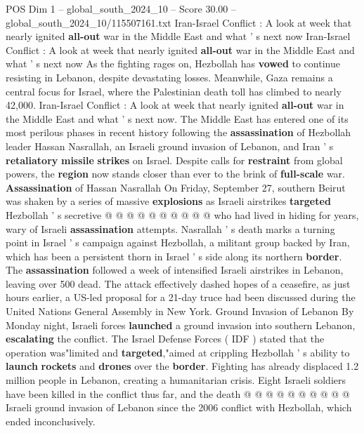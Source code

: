 \begin{textsample}{POS Dim 1 – global\_south\_2024\_10 – Score 30.00 – global\_south\_2024\_10/115507161.txt}  \label{ex:f1_pos_029}
Iran-Israel Conflict : A look at week that nearly ignited \textbf{all-out} war in the Middle East and what ' s next now Iran-Israel Conflict : A look at week that nearly ignited \textbf{all-out} war in the Middle East and what ' s next now As the fighting rages on, Hezbollah has \textbf{vowed} to continue resisting in Lebanon, despite devastating losses.
Meanwhile, Gaza remains a central focus for Israel, where the Palestinian death toll has climbed to nearly 42,000.
Iran-Israel Conflict : A look at week that nearly ignited \textbf{all-out} war in the Middle East and what ' s next now.
The Middle East has entered one of its most perilous phases in recent history following the \textbf{assassination} of Hezbollah leader Hassan Nasrallah, an Israeli ground invasion of Lebanon, and Iran ' s \textbf{retaliatory} \textbf{missile} \textbf{strikes} on Israel.
Despite calls for \textbf{restraint} from global powers, the \textbf{region} now stands closer than ever to the brink of \textbf{full-scale} war. \textbf{Assassination} of Hassan Nasrallah On Friday, September 27, southern Beirut was shaken by a series of massive \textbf{explosions} as Israeli airstrikes \textbf{targeted} Hezbollah ' s secretive @ @ @ @ @ @ @ @ @ @ who had lived in hiding for years, wary of Israeli \textbf{assassination} attempts.
Nasrallah ' s death marks a turning point in Israel ' s campaign against Hezbollah, a militant group backed by Iran, which has been a persistent thorn in Israel ' s side along its northern \textbf{border}.
The \textbf{assassination} followed a week of intensified Israeli airstrikes in Lebanon, leaving over 500 dead.
The attack effectively dashed hopes of a ceasefire, as just hours earlier, a US-led proposal for a 21-day truce had been discussed during the United Nations General Assembly in New York.
Ground Invasion of Lebanon By Monday night, Israeli forces \textbf{launched} a ground invasion into southern Lebanon, \textbf{escalating} the conflict.
The Israel Defense Forces ( IDF ) stated that the operation was"limited and \textbf{targeted},"aimed at crippling Hezbollah ' s ability to \textbf{launch} \textbf{rockets} and \textbf{drones} over the \textbf{border}.
Fighting has already displaced 1.2 million people in Lebanon, creating a humanitarian crisis.
Eight Israeli soldiers have been killed in the conflict thus far, and the death @ @ @ @ @ @ @ @ @ @ Israeli ground invasion of Lebanon since the 2006 conflict with Hezbollah, which ended inconclusively.

\end{textsample}
